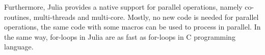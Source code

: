 Furthermore, Julia provides a native support for parallel operations, namely co-routines, multi-threads and multi-core. Mostly, no new code is needed for parallel operations, the same code with some macros can be used to process in parallel. In the same way, for-loops in Julia are as fast as for-loops in C programming language. 
